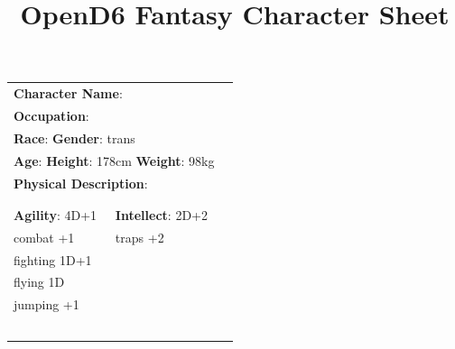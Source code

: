 \documentclass[10pt]{article}
\title{OpenD6 Fantasy Character Sheet}
\begin{document}
\pagestyle{fancy}
\fancyhf{}
\fancyfoot[R]{\thepage}
\renewcommand{\headrulewidth}{0pt}


\cleardoublepage
\begin{table}
\begin{tabular}{m{156pt} m{156pt} m{156pt}}
    \multicolumn{2}{l}{\textbf{Character Name}:  \hrulefill} \\
    \multicolumn{2}{l}{\textbf{Occupation}:  \hrulefill} \\
    \multicolumn{2}{l}{\textbf{Race}:  \hrulefill \hspace{1em} \textbf{Gender}: trans \hrulefill} \\
    \multicolumn{2}{l}{\textbf{Age}:  \hrulefill \hspace{1em} \textbf{Height}: 178cm \hrulefill \hspace{1em}  \textbf{Weight}: 98kg \hrulefill } \\
    \multicolumn{2}{l}{\textbf{Physical Description}:  \hrulefill } \\
    \multicolumn{2}{l}{ \hrulefill } \\
 & & \\
\textbf{Agility}: 4D+1 \hrulefill      & \textbf{Intellect}: 2D+2 \hrulefill  &                             \\

combat            +1 \hrulefill & traps             +2 \hrulefill & \\

fighting        1D+1 \hrulefill &  \hrulefill & \\

flying            1D \hrulefill &  \hrulefill & \\

jumping           +1 \hrulefill &  \hrulefill & \\

 \hrulefill &  \hrulefill & \\

 \hrulefill &  \hrulefill & \\

 \hrulefill &  \hrulefill & \\

 \hrulefill &  \hrulefill & \\

 \hrulefill &  \hrulefill & \\


\end{tabular}
\end{table}
\end{document}
